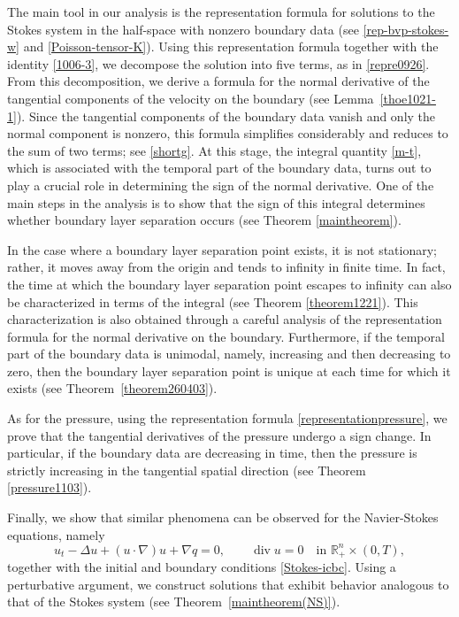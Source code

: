 \documentclass{amsart}
\numberwithin{equation}{section}
\begin{document}
The main tool in our analysis is the representation formula for solutions to the Stokes system in the half-space with nonzero boundary data (see \eqref{rep-bvp-stokes-w} and \eqref{Poisson-tensor-K}). Using this representation formula together with the identity \eqref{1006-3}, we decompose the solution into five terms, as in \eqref{repre0926}. From this decomposition, we derive a formula for the normal derivative of the tangential components of the velocity on the boundary (see Lemma~\ref{thoe1021-1}).
Since the tangential components of the boundary data vanish and only the normal component is nonzero, this formula simplifies considerably and reduces to the sum of two terms; see \eqref{shortg}. At this stage, the integral quantity \eqref{m-t}, which is associated with the temporal part of the boundary data, turns out to play a crucial role in determining the sign of the normal derivative. One of the main steps in the analysis is to show that the sign of this integral determines whether boundary layer separation occurs (see Theorem \ref{maintheorem}).

In the case where a boundary layer separation point exists, it is not stationary; rather, it moves away from the origin and tends to infinity in finite time. In fact, the time at which the boundary layer separation point escapes to infinity can also be characterized in terms of the integral (see Theorem \ref{theorem1221}). This characterization is also obtained through a careful analysis of the representation formula for the normal derivative on the boundary.
Furthermore, if the temporal part of the boundary data is unimodal, namely, increasing and then decreasing to zero, then the boundary layer separation point is unique at each time for which it exists (see Theorem~\ref{theorem260403}).

As for the pressure, using the representation formula \eqref{representationpressure}, we prove that the tangential derivatives of the pressure undergo a sign change. In particular, if the boundary data are decreasing in time, then the pressure is strictly increasing in the tangential spatial direction (see Theorem \ref{pressure1103}).

Finally, we show that  similar phenomena can be observed for the Navier-Stokes equations, namely
\begin{equation}\label{nse-30}
u_t - \Delta u + (u\cdot\nabla)u + \nabla q = 0,
\qquad
\operatorname{div} u = 0
\quad \text{in } \mathbb{R}^n_+ \times (0,T),
\end{equation}
together with the initial and boundary conditions \eqref{Stokes-icbc}. Using a perturbative argument, we construct solutions that exhibit behavior analogous to that of the Stokes system (see Theorem~\ref{maintheorem(NS)}).
\end{document}
